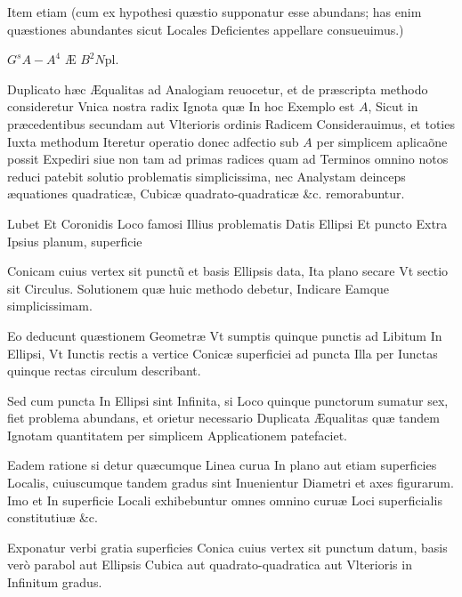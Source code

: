 \documentclass[11pt,a4paper]{article}
\begin{document}
Item etiam (cum ex hypothesi quæstio supponatur esse abundans; has enim quæstiones abundantes sicut Locales \struck{\ill{}} Deficientes appellare consueuimus.)

$G^sA - A^4$ Æ $B^2N$pl.

Duplicato hæc Æqualitas ad Analogiam reuocetur, et de præscripta methodo consideretur Vnica nostra radix Ignota quæ In hoc Exemplo est $A$, Sicut in præcedentibus secundam aut Vlterioris ordinis Radicem Considerauimus, et toties Iuxta methodum Iteretur operatio donec adfectio sub $A$ per simplicem aplicaõne possit Expediri siue non tam ad primas radices quam ad Terminos omnino notos reduci patebit solutio problematis simplicissima, nec Analystam deinceps æquationes quadraticæ, Cubicæ quadrato-quadraticæ \&c. remorabuntur.

Lubet Et Coronidis Loco famosi Illius problematis Datis Ellipsi Et puncto Extra Ipsius planum, superficie


Conicam cuius vertex sit punctũ  et basis Ellipsis data, Ita plano secare Vt sectio sit Circulus. Solutionem quæ huic methodo debetur, Indicare Eamque simplicissimam.

Eo deducunt quæstionem Geometræ Vt sumptis quinque punctis ad Libitum In Ellipsi, Vt Iunctis rectis a vertice Conicæ superficiei ad puncta Illa per Iunctas quinque rectas circulum describant.

Sed cum puncta In Ellipsi sint Infinita, si Loco quinque punctorum sumatur sex, fiet problema abundans, et orietur necessario Duplicata Æqualitas quæ tandem Ignotam quantitatem per simplicem Applicationem patefaciet.

Eadem ratione si detur quæcumque Linea curua In plano aut etiam superficies Localis, cuiuscumque tandem gradus sint Inuenientur Diametri et axes figurarum. Imo et In superficie Locali exhibebuntur omnes omnino curuæ Loci superficialis constitutiuæ \&c.

Exponatur verbi gratia superficies Conica cuius vertex sit punctum datum, basis verò parabol aut Ellipsis Cubica aut quadrato-quadratica aut Vlterioris in Infinitum gradus.
\end{document}
